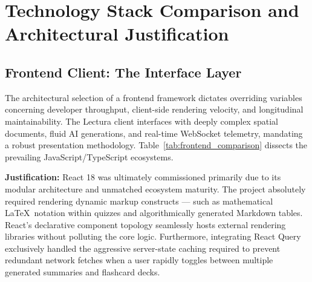\chapter{Technology Stack Comparison and Architectural Justification}
\label{chap:tech_justification}
\setlength{\parskip}{1em}

\section{Frontend Client: The Interface Layer}
The architectural selection of a frontend framework dictates overriding variables concerning developer throughput, client-side rendering velocity, and longitudinal maintainability. The Lectura client interfaces with deeply complex spatial documents, fluid AI generations, and real-time WebSocket telemetry, mandating a robust presentation methodology. Table~\ref{tab:frontend_comparison} dissects the prevailing JavaScript/TypeScript ecosystems.

\begin{table}[htbp]
\centering
{}
\vspace{6pt}
\caption{Analytical matrix of contemporary frontend SPA architectures.}
\label{tab:frontend_comparison}
\end{table}

\textbf{Justification:} React 18 was ultimately commissioned primarily due to its modular architecture and unmatched ecosystem maturity. The project absolutely required rendering dynamic markup constructs — such as mathematical \LaTeX\ notation within quizzes and algorithmically generated Markdown tables. React’s declarative component topology seamlessly hosts external rendering libraries without polluting the core logic. Furthermore, integrating React Query exclusively handled the aggressive server-state caching required to prevent redundant network fetches when a user rapidly toggles between multiple generated summaries and flashcard decks.

